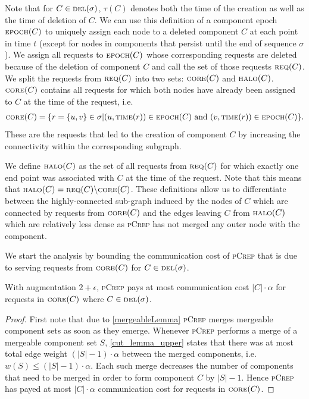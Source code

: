 \documentclass[a4paper,UKenglish,cleveref, autoref, thm-restate,authorcolumns]{lipics-v2019}
\newcommand{\adjDel}{\textsc{pCrep}}
\newcommand{\del}{\text{\scriptsize DEL}}
\newcommand{\core}{\text{\scriptsize CORE}}
\newcommand{\halo}{\text{\scriptsize HALO}}
\newcommand{\req}{\text{\scriptsize REQ}}
\newcommand{\epoch}{\text{\scriptsize EPOCH}}
\newcommand{\reqTime}{\text{\scriptsize TIME}}
\begin{document}
Note that for $C\in\del(\sigma)$, $\tau(C)$ denotes both the time of the creation as well as the time of deletion of $C$. We can use this definition of a component epoch $\epoch(C)$ to uniquely assign each node to a deleted component $C$ at each point in time $t$ (except for nodes in components that persist until the end of sequence $\sigma$).
We assign all requests to $\epoch(C)$ whose corresponding requests are deleted because of the deletion of component $C$ and call the set of those requests $\req(C)$.
We split the requests from $\req{}(C)$ into two sets: $\core(C)$ and $\halo(C)$. $\core(C)$ contains all requests for which both nodes have already been assigned to $C$ at the time of the request, i.e. 
\begin{align*}
\core(C)=\{r=\{u,v\}\in\sigma| (u,\reqTime(r))\in \epoch(C)\text{ and } (v, \reqTime(r))\in \epoch(C)\}.
\end{align*}
These are the requests that led to the creation of component $C$ by increasing the connectivity within the corresponding subgraph.

We define $\halo(C)$ as the set of all requests from $\req(C)$ for which exactly one end point was associated with $C$ at the time of the request. Note that this means that $\halo(C)=\req(C)\backslash \core(C)$.
These definitions allow us to differentiate between the highly-connected sub-graph induced by the nodes of $C$ which are connected by requests from $\core(C)$ and the edges leaving $C$ from $\halo(C)$ which are relatively less dense as \adjDel{} has not merged any outer node with the component.

We start the analysis by bounding the communication cost of \adjDel{} that is due to serving requests from $\core(C)$ for $C\in\del{}(\sigma)$.

\begin{lemma}
	\label{core_comm_upper}
	With augmentation $2+\epsilon$, \adjDel{} pays at most communication cost $|C|\cdot\alpha$ for requests in $\core(C)$ where $C\in\del{}(\sigma)$.
\end{lemma}

\begin{proof}
	First note that due to \cref{mergeableLemma} \adjDel{} merges mergeable component sets as soon as they emerge.
	Whenever \adjDel{} performs a merge of a mergeable component set $S$, \cref{cut_lemma_upper} states that there was at most total edge weight $(|S|-1)\cdot\alpha$ between the merged components, i.e. $w(S)\leq(|S|-1)\cdot\alpha$. Each such merge decreases the number of components that need to be merged in order to form component $C$ by $|S|-1$. Hence \adjDel{} has payed at most $|C|\cdot\alpha$ communication cost for requests in $\core(C)$.
\end{proof}
\end{document}
